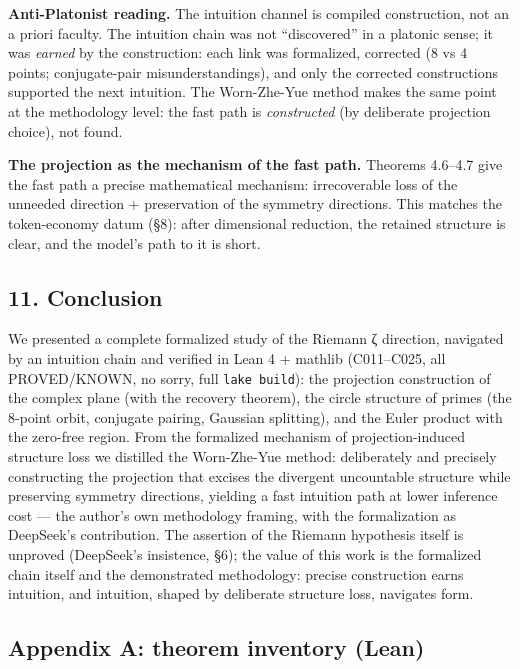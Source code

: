 \documentclass[
]{article}
\begin{document}
\textbf{Anti-Platonist reading.} The intuition channel is compiled
construction, not an a priori faculty. The intuition chain was not
``discovered'' in a platonic sense; it was \emph{earned} by the
construction: each link was formalized, corrected (8 vs 4 points;
conjugate-pair misunderstandings), and only the corrected constructions
supported the next intuition. The Worn-Zhe-Yue method makes the same
point at the methodology level: the fast path is \emph{constructed} (by
deliberate projection choice), not found.

\textbf{The projection as the mechanism of the fast path.} Theorems
4.6--4.7 give the fast path a precise mathematical mechanism:
irrecoverable loss of the unneeded direction + preservation of the
symmetry directions. This matches the token-economy datum (§8): after
dimensional reduction, the retained structure is clear, and the model's
path to it is short.

\subsection{11. Conclusion}\label{conclusion}

We presented a complete formalized study of the Riemann ζ direction,
navigated by an intuition chain and verified in Lean 4 + mathlib
(C011--C025, all PROVED/KNOWN, no sorry, full \texttt{lake\ build}): the
projection construction of the complex plane (with the recovery
theorem), the circle structure of primes (the 8-point orbit, conjugate
pairing, Gaussian splitting), and the Euler product with the zero-free
region. From the formalized mechanism of projection-induced structure
loss we distilled the Worn-Zhe-Yue method: deliberately and precisely
constructing the projection that excises the divergent uncountable
structure while preserving symmetry directions, yielding a fast
intuition path at lower inference cost --- the author's own methodology
framing, with the formalization as DeepSeek's contribution. The
assertion of the Riemann hypothesis itself is unproved (DeepSeek's
insistence, §6); the value of this work is the formalized chain itself
and the demonstrated methodology: precise construction earns intuition,
and intuition, shaped by deliberate structure loss, navigates form.

\subsection{Appendix A: theorem inventory
(Lean)}\label{appendix-a-theorem-inventory-lean}
\end{document}
